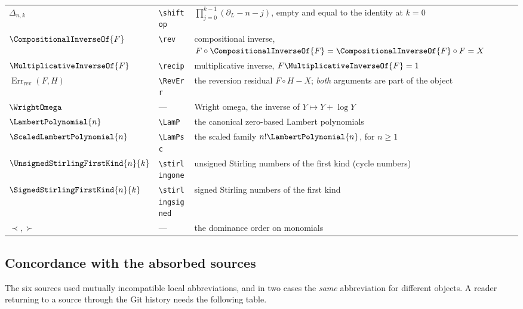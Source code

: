 \documentclass[11pt,oneside]{article}
\theoremstyle{plain}
\theoremstyle{definition}
\theoremstyle{remark}
\newcommand{\shiftop}[2]{\Delta_{#1,#2}}                 %
\newcommand{\compose}{\mathbin{\circ}}
\newcommand{\rev}[1]{\CompositionalInverseOf{#1}}
\newcommand{\recip}[1]{\MultiplicativeInverseOf{#1}}
\newcommand{\stirlingone}[2]{\UnsignedStirlingFirstKind{#1}{#2}}
\newcommand{\stirlingsigned}[2]{\SignedStirlingFirstKind{#1}{#2}}
\newcommand{\LamP}[1]{\LambertPolynomial{#1}}
\newcommand{\LamPsc}[1]{\ScaledLambertPolynomial{#1}}
\newcommand{\RevErr}[2]{\operatorname{Err}_{\mathrm{rev}}\!\left(#1,#2\right)}
\newcommand{\precdom}{\prec}
\newcommand{\succdom}{\succ}
\begin{document}
\begin{longtable}{@{}l l p{}@{}}
\(\shiftop{n}{k}\) & \verb|\shiftop| & \(\prod_{j=0}^{k-1}(\partial_L-n-j)\),
  empty and equal to the identity at \(k=0\)\\
\(\rev{F}\) & \verb|\rev| & compositional inverse,
  \(F\compose\rev{F}=\rev{F}\compose F=X\)\\
\(\recip{F}\) & \verb|\recip| & multiplicative inverse, \(F\recip{F}=1\)\\
\(\RevErr{F}{H}\) & \verb|\RevErr| & the reversion residual
  \(F\compose H-X\); \emph{both} arguments are part of the object\\
\(\WrightOmega\) & --- & Wright omega, the inverse of \(Y\mapsto Y+\log Y\)\\
\(\LamP{n}\) & \verb|\LamP| & the canonical zero-based Lambert polynomials\\
\(\LamPsc{n}\) & \verb|\LamPsc| & the scaled family \(n!\LamP{n}\), for
  \(n\ge1\)\\
\(\stirlingone{n}{k}\) & \verb|\stirlingone| & unsigned Stirling numbers of the
  first kind (cycle numbers)\\
\(\stirlingsigned{n}{k}\) & \verb|\stirlingsigned| & signed Stirling numbers of
  the first kind\\
\(\precdom,\succdom\) & --- & the dominance order on monomials\\
\bottomrule
\end{longtable}

\subsection{Concordance with the absorbed sources}

The six sources used mutually incompatible local abbreviations, and in two
cases the \emph{same} abbreviation for different objects.  A reader returning
to a source through the Git history needs the following table.
\end{document}
